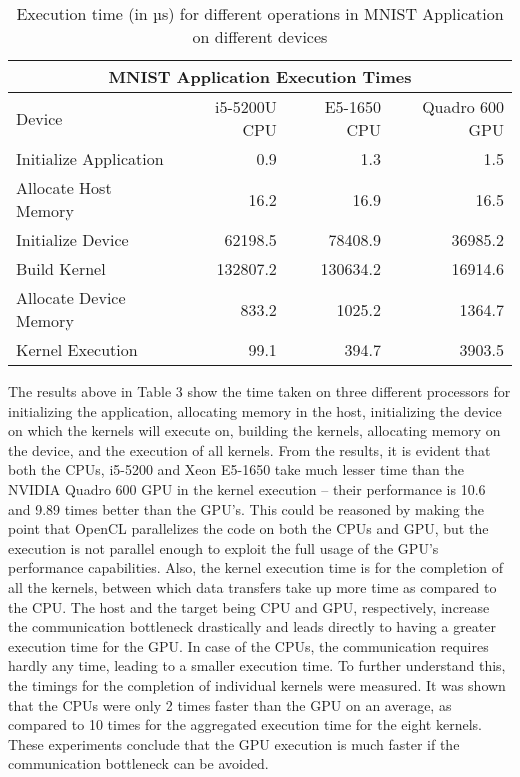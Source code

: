\begin{table}[h!]
\centering
 \caption{Execution time (in µs) for different operations in MNIST Application on different devices}
 \begin{tabular}{ | l | r | r | r |  }
 \hline
 \multicolumn{4}{|c|}{MNIST Application Execution Times} \\
 \hline
  Device & i5-5200U CPU & E5-1650 CPU& Quadro 600 GPU\\
 \hline
 Initialize Application & 0.9 & 1.3 & 1.5 \\
 Allocate Host Memory & 16.2 & 16.9 & 16.5\\
 Initialize Device & 62198.5 & 78408.9 & 36985.2 \\
 Build Kernel & 132807.2 & 130634.2 & 16914.6 \\
 Allocate Device Memory & 833.2 & 1025.2 & 1364.7 \\
 Kernel Execution & 99.1 & 394.7 & 3903.5 \\
 \hline
 \end{tabular}
 \label{table:mnist}
\end{table}

The results above in Table 3 show the time taken on three different processors for initializing the application, allocating memory in the host, initializing the device on which the kernels will execute on, building the kernels, allocating memory on the device, and the execution of all kernels. \newline\newline
From the results, it is evident that both the CPUs, i5-5200 and Xeon E5-1650 take much lesser time than the NVIDIA Quadro 600 GPU in the kernel execution – their performance is 10.6 and 9.89 times better than the GPU’s. This could be reasoned by making the point that OpenCL parallelizes the code on both the CPUs and GPU, but the execution is not parallel enough to exploit the full usage of the GPU’s performance capabilities. Also, the kernel execution time is for the completion of all the kernels, between which data transfers take up more time as compared to the CPU. The host and the target being CPU and GPU, respectively, increase the communication bottleneck drastically and leads directly to having a greater execution time for the GPU. In case of the CPUs, the communication requires hardly any time, leading to a smaller execution time. \newline\newline
To further understand this, the timings for the completion of individual kernels were measured. It was shown that the CPUs were only 2 times faster than the GPU on an average, as compared to 10 times for the aggregated execution time for the eight kernels. These experiments conclude that the GPU execution is much faster if the communication bottleneck can be avoided. \newline\newline



